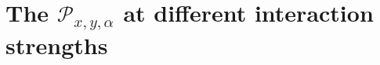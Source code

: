 \documentclass[longbibliography, aps, prx, amsmath, amssymb, amsfonts, twocolumn,superscriptaddress, footinbib]{revtex4-1}
\begin{document}


	
	\section{The $\mathcal{P}_{x,y,\alpha}$ at different interaction strengths~\label{sec:AllP}}
\end{document}
